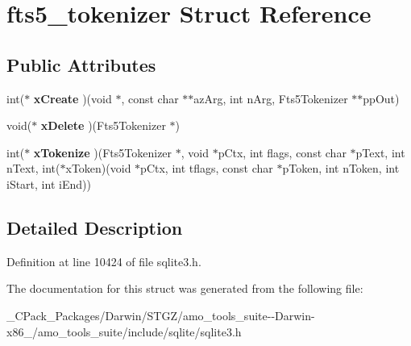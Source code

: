 \hypertarget{structfts5__tokenizer}{}\section{fts5\+\_\+tokenizer Struct Reference}
\label{structfts5__tokenizer}
\subsection*{Public Attributes}
\begin{DoxyCompactItemize}
\item 
\mbox{\label{structfts5__tokenizer_ab0e73328047d3191668ecad51839873d}} 
int($\ast$ {\bfseries x\+Create} )(void $\ast$, const char $\ast$$\ast$az\+Arg, int n\+Arg, Fts5\+Tokenizer $\ast$$\ast$pp\+Out)
\item 
\mbox{\label{structfts5__tokenizer_a5df6926b15f5ccbffdcdf635f2f76142}} 
void($\ast$ {\bfseries x\+Delete} )(Fts5\+Tokenizer $\ast$)
\item 
\mbox{\label{structfts5__tokenizer_aca859d7c328ff545aef9a16c07a70ed4}} 
int($\ast$ {\bfseries x\+Tokenize} )(Fts5\+Tokenizer $\ast$, void $\ast$p\+Ctx, int flags, const char $\ast$p\+Text, int n\+Text, int($\ast$x\+Token)(void $\ast$p\+Ctx, int tflags, const char $\ast$p\+Token, int n\+Token, int i\+Start, int i\+End))
\end{DoxyCompactItemize}


\subsection{Detailed Description}


Definition at line 10424 of file sqlite3.\+h.



The documentation for this struct was generated from the following file\+:\begin{DoxyCompactItemize}
\item 
\+\_\+\+C\+Pack\+\_\+\+Packages/\+Darwin/\+S\+T\+G\+Z/amo\+\_\+tools\+\_\+suite-\/-\/\+Darwin-\/x86\+\_/amo\+\_\+tools\+\_\+suite/include/sqlite/sqlite3.\+h\end{DoxyCompactItemize}
